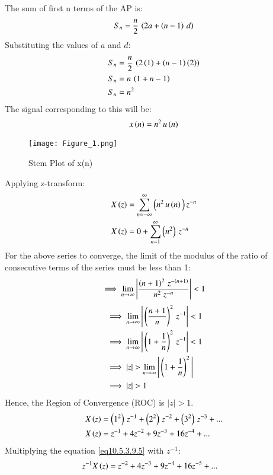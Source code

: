 \documentclass[journal,12pt,twocolumn]{IEEEtran}
\theoremstyle{remark}
\begin{document}
The sum of first n terms of the AP is:
\begin{align}
S_n= \frac{n}{2}\,\left(2a+\left(n-1\right)\,d\right)\label{eq10.5.3.9.4}
\end{align}
Substituting the values of $a$ and $d$:
\begin{align}
S_n&=\frac{n}{2}\,\left(2\left(1\right)+\left(n-1\right)\left(2\right)\right)  \\
S_n&=n\,\left(1+n-1\right)  \\
S_n&=n^2\label{eq10.5.3.9.5}
\end{align}
The signal corresponding to this will be:
\begin{align}
    x\left(n\right)= n^2\,u\left(n\right)  
\end{align}

\begin{figure}[h]
    \renewcommand\thefigure{1}
    \centering
    \captionsetup{justification=centering}
    \texttt{[image: Figure\_1.png]}
    \caption{Stem Plot of x(n)}
    \label{stemplot}
\end{figure}
Applying z-transform:
\begin{align}
X\left(z\right)&=\sum_{n=-\infty}^{\infty}\left(n^2\,u\left(n\right)\,\right)z^{-n}  \\
X\left(z\right)&=0+ \sum_{n=1}^\infty \left(n^2\right)\,z^{-n}  
\end{align}
For the above series to converge, the limit of the modulus of the ratio of consecutive terms of the series must be less than 1:
\begin{align}
\implies\lim_{n\to\infty}\Bigg|\frac{\left(n+1\right)^2\,z^{-\left(n+1\right)}}{n^2\; z^{-n}}\Bigg|<1  
\end{align}
\begin{align}
&\implies\lim_{n\to\infty}\Bigg|\brak{\frac{n+1}{n}}^2\, z^{-1}\Bigg|<1  \\
&\implies\lim_{n\to\infty}\Bigg|\brak{1+\frac{1}{n}}^2\, z^{-1}\Bigg|<1  \\
&\implies|z|>\lim_{n\to\infty}\Bigg|\brak{1+\frac{1}{n}}^2\Bigg|  \\
&\implies|z|>1  
\end{align}
Hence, the Region of Convergence (ROC) is $|z|>1$.
\begin{align}
X\left(z\right)&=\left(1^2\right)\,z^{-1}+\left(2^2\right)\,z^{-2}+\left(3^2\right)\,z^{-3}+...  \\
X\left(z\right)&=z^{-1}+4z^{-2}+9z^{-3}+16z^{-4}+...\label{eq10.5.3.9.6}
\end{align}
Multiplying the equation \ref{eq10.5.3.9.5} with $z^{-1}$:\\
\begin{align}
z^{-1}X\left(z\right)&=z^{-2}+4z^{-3}+9z^{-4}+16z^{-5}+...\label{eq10.5.3.9.7}
\end{align}
\end{document}
